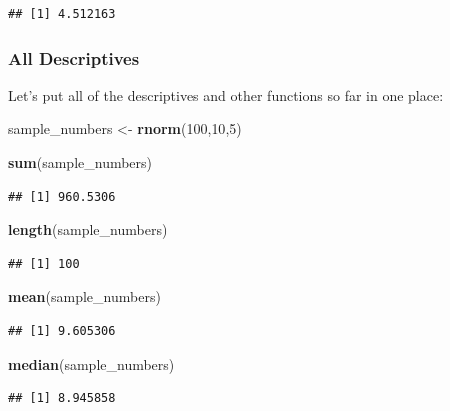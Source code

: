 \documentclass[
]{book}
\newenvironment{Shaded}{\begin{snugshade}}{\end{snugshade}}
\newcommand{\DecValTok}[1]{\textcolor[rgb]{0.00,0.00,0.81}{#1}}
\newcommand{\FunctionTok}[1]{\textcolor[rgb]{0.13,0.29,0.53}{\textbf{#1}}}
\newcommand{\NormalTok}[1]{#1}
\newcommand{\OtherTok}[1]{\textcolor[rgb]{0.56,0.35,0.01}{#1}}
\begin{document}
\begin{verbatim}
## [1] 4.512163
\end{verbatim}

\hypertarget{all-descriptives}{%
\subsubsection{All Descriptives}\label{all-descriptives}}

Let's put all of the descriptives and other functions so far in one place:

\begin{Shaded}
\begin{Highlighting}[]
\NormalTok{sample\_numbers }\OtherTok{\textless{}{-}} \FunctionTok{rnorm}\NormalTok{(}\DecValTok{100}\NormalTok{,}\DecValTok{10}\NormalTok{,}\DecValTok{5}\NormalTok{)}

\FunctionTok{sum}\NormalTok{(sample\_numbers)}
\end{Highlighting}
\end{Shaded}

\begin{verbatim}
## [1] 960.5306
\end{verbatim}

\begin{Shaded}
\begin{Highlighting}[]
\FunctionTok{length}\NormalTok{(sample\_numbers)}
\end{Highlighting}
\end{Shaded}

\begin{verbatim}
## [1] 100
\end{verbatim}

\begin{Shaded}
\begin{Highlighting}[]
\FunctionTok{mean}\NormalTok{(sample\_numbers)}
\end{Highlighting}
\end{Shaded}

\begin{verbatim}
## [1] 9.605306
\end{verbatim}

\begin{Shaded}
\begin{Highlighting}[]
\FunctionTok{median}\NormalTok{(sample\_numbers)}
\end{Highlighting}
\end{Shaded}

\begin{verbatim}
## [1] 8.945858
\end{verbatim}
\end{document}
